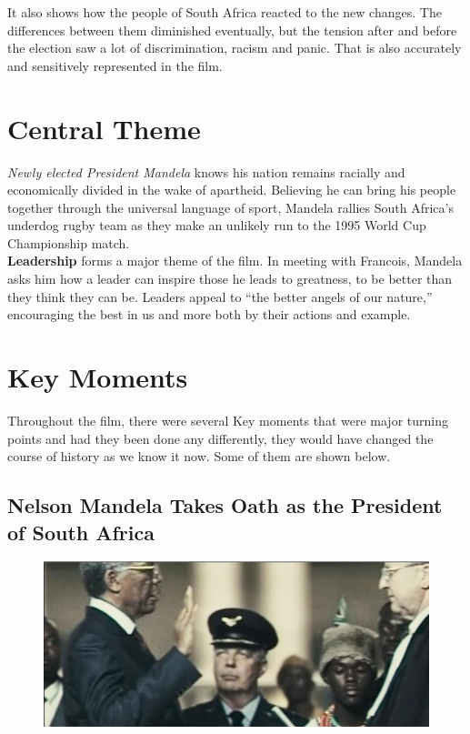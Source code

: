 \documentclass[11pt]{article}
\begin{document}
It also shows how the people of South Africa
reacted to the new changes.
The differences between them diminished
eventually, but the tension after and before
the election saw a lot of discrimination, racism
and panic. That is also accurately and
sensitively represented in the film.
\section{Central Theme}
\textit{Newly elected President Mandela} knows his nation remains racially and
economically divided in the wake of apartheid. Believing he can bring his
people together through the universal language of sport, Mandela rallies
South Africa's underdog rugby team as they make an unlikely run to the
1995 World Cup Championship match.\\

\textbf{Leadership} forms a major theme of the film. In meeting with Francois,
Mandela asks him how a leader can inspire those he leads to greatness,
to be better than they think they can be. Leaders appeal to “the better
angels of our nature,” encouraging the best in us and more both by their
actions and example.
\section{Key Moments}
Throughout the film, there were several Key
moments that were major turning points
and had they been done any differently,
they would have changed the course of
history as we know it now. Some of them are shown below. 

\subsection{Nelson Mandela Takes Oath as the President of South Africa}

\begin{figure}[H]
	\centering
	\includegraphics[scale=0.4]{1.jpg}
\end{figure}
\end{document}
